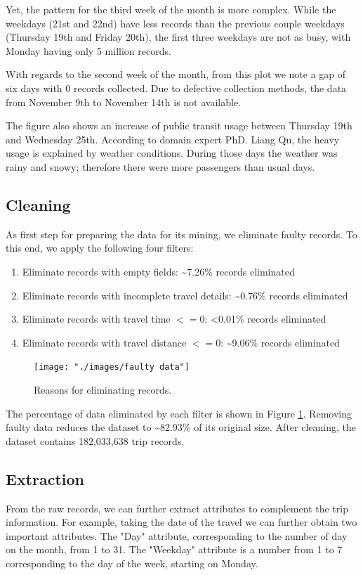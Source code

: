 \documentclass{article}
\begin{document}
Yet, the pattern for the third week of the month is more complex. While the weekdays (21st and 22nd) have less records than the previous couple weekdays (Thursday 19th and Friday 20th), the first three weekdays are not as busy, with Monday having only 5 million records.

With regards to the second week of the month, from this plot we note a gap of six days with 0 records collected. Due to defective collection methods, the data from November 9th to November 14th is not available. 

The figure also shows an increase of public transit usage between Thursday 19th and Wednesday 25th. According to domain expert PhD. Liang Qu, the heavy usage is explained by weather conditions. During those days the weather was rainy and snowy; therefore there were more passengers than usual days.

\subsection{Cleaning}
As first step for preparing the data for its mining, we eliminate faulty records. To this end, we apply the following four filters:

\begin{enumerate}
\item Eliminate records with empty fields: \textasciitilde 7.26\% records eliminated
\item Eliminate records with incomplete travel details: \textasciitilde 0.76\% records eliminated
\item Eliminate records with travel time $<= 0$: <0.01\% records eliminated
\item Eliminate records with travel distance $<= 0$: \textasciitilde 9.06\% records eliminated
\end{enumerate}

\begin{figure}[h]
  \centering
  \texttt{[image: "./images/faulty data"]} %
  \caption{Reasons for eliminating records.}
  \label{fig:preprocessing/faulty}
\end{figure}

The percentage of data eliminated by each filter is shown in Figure \ref{fig:preprocessing/faulty}. Removing faulty data reduces the dataset to \textasciitilde 82.93\% of its original size. After cleaning, the dataset contains 182,033,638 trip records.  %

\subsection{Extraction}
From the raw records, we can further extract attributes to complement the trip information. For example, taking the date of the travel we can further obtain two important attributes. The "Day" attribute, corresponding to the number of day on the month, from 1 to 31. The "Weekday" attribute is a number from 1 to 7 corresponding to the day of the week, starting on Monday.
\end{document}
